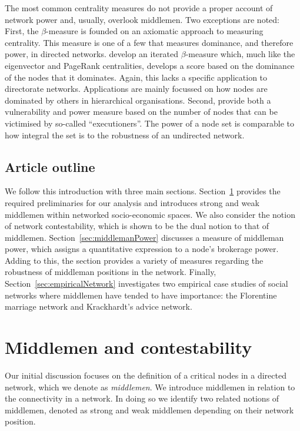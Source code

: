 \documentclass[11pt,fleqn]{article}
\begin{document}
The most common centrality measures do not provide a proper account of network power and, usually, overlook middlemen. Two exceptions are noted: First, the $\beta$-measure \citep{BrinkGilles1996, BrinkGilles2000} is founded on an axiomatic approach to measuring centrality. This measure is one of a few that measures dominance, and therefore power, in directed networks. \citet{BormBrink2002} develop an iterated $\beta$-measure which, much like the eigenvector and PageRank centralities, develops a score based on the dominance of the nodes that it dominates. Again, this lacks a specific application to directorate networks. Applications are mainly focussed on how nodes are dominated by others in hierarchical organisations. Second, \citet{Bozzo2015} provide both a vulnerability and power measure based on the number of nodes that can be victimised by so-called ``executioners''. The power of a node set is comparable to how integral the set is to the robustness of an undirected network.

\subsection{Article outline}

We follow this introduction with three main sections. Section~\ref{sec:middlemenContestability} provides the required preliminaries for our analysis and introduces strong and weak middlemen within networked socio-economic spaces. We also consider the notion of network contestability, which is shown to be the dual notion to that of middlemen. Section~\ref{sec:middlemanPower} discusses a measure of middleman power, which assigns a quantitative expression to a node's brokerage power. Adding to this, the section provides a variety of measures regarding the robustness of middleman positions in the network. Finally, Section~\ref{sec:empiricalNetwork} investigates two empirical case studies of social networks where middlemen have tended to have importance: the Florentine marriage network and Krackhardt's advice network.

\section{Middlemen and contestability}
\label{sec:middlemenContestability}

Our initial discussion focuses on the definition of a critical nodes in a directed network, which we denote as \emph{middlemen}. We introduce middlemen in relation to the connectivity in a network. In doing so we identify two related notions of middlemen, denoted as strong and weak middlemen depending on their network position.
\end{document}
